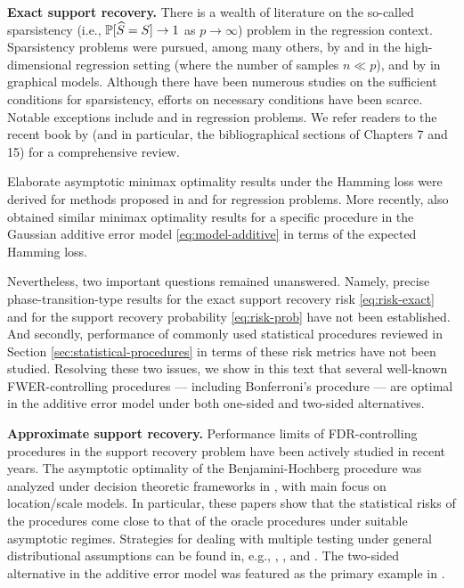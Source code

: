 \medskip

{\bf Exact support recovery.}
There is a wealth of literature on the so-called sparsistency (i.e., $\P[\widehat{S} = S]\to 1$ as $p\to\infty$) problem in the regression context. 
Sparsistency problems were pursued, among many others, by \citet{zhao2006model} and \citet{wasserman2009high} in the high-dimensional regression setting (where the number of samples $n\ll p$), and by \citet*{meinshausen2006high} in graphical models.
Although there have been numerous studies on the sufficient conditions for sparsistency, efforts on necessary conditions have been scarce.
Notable exceptions include \cite{wainwright2009information, wainwright2009sharp} and \cite{comminges2012tight} in regression problems.
We refer readers to the recent book by \cite{wainwright2019high} (and in particular, the bibliographical sections of Chapters 7 and 15) for a comprehensive review.

Elaborate asymptotic minimax optimality results under the Hamming loss were derived for methods proposed in \cite{ji2012ups} and \cite{jin2014optimality} for regression problems.
More recently, \cite{butucea2018variable} also obtained similar minimax optimality results for a specific procedure in the Gaussian additive error model \eqref{eq:model-additive} in terms of the expected Hamming loss.

Nevertheless, two important questions remained unanswered.
Namely, precise phase-transition-type results for the exact support recovery risk \eqref{eq:risk-exact} and for the support recovery probability \eqref{eq:risk-prob} 
have not been established.
And secondly, performance of commonly used statistical procedures reviewed in Section \ref{sec:statistical-procedures}
in terms of these risk metrics have not been studied.
Resolving these two issues, we show in this text that several well-known FWER-controlling procedures --- including Bonferroni's procedure --- are optimal in the additive error model under both one-sided and two-sided alternatives.

\medskip

{\bf Approximate support recovery.}
Performance limits of FDR-controlling procedures in the support recovery problem have been actively studied in recent years.
The asymptotic optimality of the Benjamini-Hochberg procedure
was analyzed under decision theoretic frameworks in \cite{genovese2002operating, bogdan2011asymptotic, neuvial2012false}, with main focus on location/scale models. 
In particular, these papers show that the statistical risks of the procedures come close to that of the oracle procedures under suitable asymptotic regimes.
Strategies for dealing with multiple testing under general distributional assumptions can be found in, e.g., \cite{efron2004large}, \cite{storey2007optimal}, and \cite{sun2007oracle}.
The two-sided alternative in the additive error model was featured as the primary example in \cite{sun2007oracle}.

